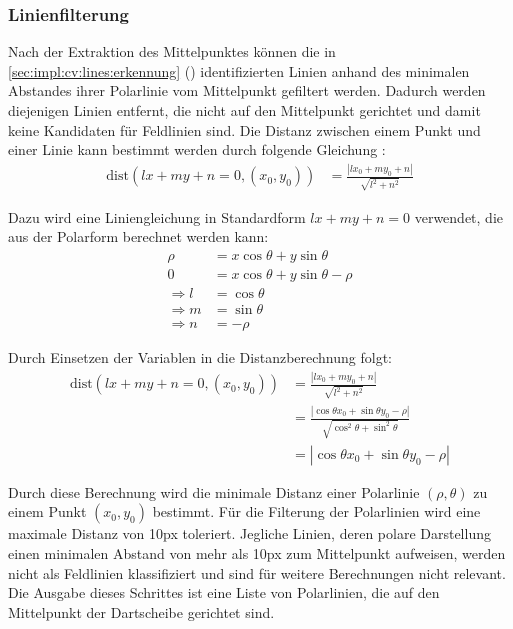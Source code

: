 \subsubsection{Linienfilterung}
\label{sec:impl:cv:lines:filter}

Nach der Extraktion des Mittelpunktes können die in \autoref{sec:impl:cv:lines:erkennung} () identifizierten Linien anhand des minimalen Abstandes ihrer Polarlinie vom Mittelpunkt gefiltert werden. Dadurch werden diejenigen Linien entfernt, die nicht auf den Mittelpunkt gerichtet und damit keine Kandidaten für Feldlinien sind. Die Distanz zwischen einem Punkt und einer Linie kann bestimmt werden durch folgende Gleichung \cite{point_line_distance}:
\begin{align*}
    \text{dist}(lx + my + n = 0, (x_0, y_0)) & = \frac{| l x_0 + m y_0 + n|}{\sqrt{l^2+n^2}}
\end{align*}

Dazu wird eine Liniengleichung in Standardform $ lx + my + n = 0 $ verwendet, die aus der Polarform berechnet werden kann:
\begin{align*}
    \rho          & = x \cos{\theta} + y \sin{\theta}        \\
    0             & = x \cos{\theta} + y \sin{\theta} - \rho \\
    \Rightarrow l & = \cos{\theta}                           \\
    \Rightarrow m & = \sin{\theta}                           \\
    \Rightarrow n & = -\rho
\end{align*}

Durch Einsetzen der Variablen in die Distanzberechnung folgt:
\begin{align*}
    \text{dist}(lx + my + n = 0, (x_0, y_0)) & = \frac{| l x_0 + m y_0 + n|}{\sqrt{l^2+n^2}}                                                   \\
                                             & = \frac{| \cos{\theta} x_0 + \sin{\theta} y_0 - \rho |}{\sqrt{\cos^2{\theta} + \sin^2{\theta}}} \\
                                             & = | \cos{\theta} x_0 + \sin{\theta} y_0 - \rho |
\end{align*}

Durch diese Berechnung wird die minimale Distanz einer Polarlinie $(\rho, \theta)$ zu einem Punkt $(x_0, y_0)$ bestimmt. Für die Filterung der Polarlinien wird eine maximale Distanz von 10px toleriert. Jegliche Linien, deren polare Darstellung einen minimalen Abstand von mehr als 10px zum Mittelpunkt aufweisen, werden nicht als Feldlinien klassifiziert und sind für weitere Berechnungen nicht relevant. Die Ausgabe dieses Schrittes ist eine Liste von Polarlinien, die auf den Mittelpunkt der Dartscheibe gerichtet sind.

